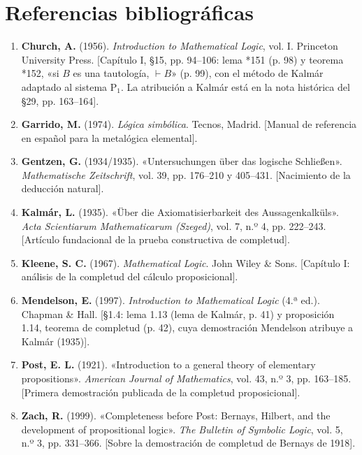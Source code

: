 \section*{Referencias bibliográficas}

\begin{enumerate}
    \item \textbf{Church, A.} (1956). \emph{Introduction to Mathematical Logic}, vol. I. Princeton University Press. [Capítulo I, §15, pp. 94--106: lema *151 (p. 98) y teorema *152, «si $B$ es una tautología, $\vdash B$» (p. 99), con el método de Kalmár adaptado al sistema P$_1$. La atribución a Kalmár está en la nota histórica del §29, pp. 163--164].
    \item \textbf{Garrido, M.} (1974). \emph{Lógica simbólica}. Tecnos, Madrid. [Manual de referencia en español para la metalógica elemental].
    \item \textbf{Gentzen, G.} (1934/1935). «Untersuchungen über das logische Schließen». \emph{Mathematische Zeitschrift}, vol. 39, pp. 176--210 y 405--431. [Nacimiento de la deducción natural].
    \item \textbf{Kalmár, L.} (1935). «Über die Axiomatisierbarkeit des Aussagenkalküls». \emph{Acta Scientiarum Mathematicarum (Szeged)}, vol. 7, n.º 4, pp. 222--243. [Artículo fundacional de la prueba constructiva de completud].
    \item \textbf{Kleene, S. C.} (1967). \emph{Mathematical Logic}. John Wiley \& Sons. [Capítulo I: análisis de la completud del cálculo proposicional].
    \item \textbf{Mendelson, E.} (1997). \emph{Introduction to Mathematical Logic} (4.ª ed.). Chapman \& Hall. [§1.4: lema 1.13 (lema de Kalmár, p. 41) y proposición 1.14, teorema de completud (p. 42), cuya demostración Mendelson atribuye a Kalmár (1935)].
    \item \textbf{Post, E. L.} (1921). «Introduction to a general theory of elementary propositions». \emph{American Journal of Mathematics}, vol. 43, n.º 3, pp. 163--185. [Primera demostración publicada de la completud proposicional].
    \item \textbf{Zach, R.} (1999). «Completeness before Post: Bernays, Hilbert, and the development of propositional logic». \emph{The Bulletin of Symbolic Logic}, vol. 5, n.º 3, pp. 331--366. [Sobre la demostración de completud de Bernays de 1918].
\end{enumerate}

